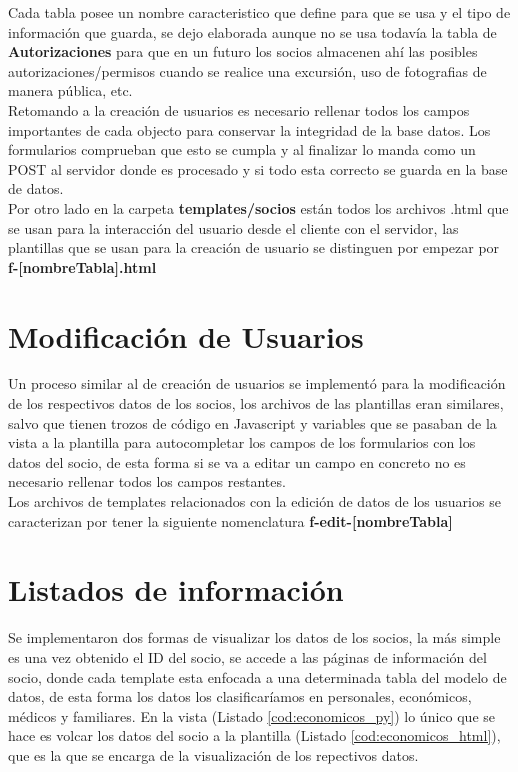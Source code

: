 Cada tabla posee un nombre caracteristico que define para que se usa y el tipo de información que guarda, se dejo elaborada aunque no se usa todavía la tabla de \textbf{Autorizaciones} para que en un futuro los socios almacenen ahí las posibles autorizaciones/permisos
cuando se realice una excursión, uso de fotografias de manera pública, etc.\\

Retomando a la creación de usuarios es necesario rellenar todos los campos importantes de cada objecto para conservar la integridad de la base datos. Los formularios comprueban que esto se cumpla y al finalizar lo manda como un POST
al servidor donde es procesado y si todo esta correcto se guarda en la base de datos.\\

Por otro lado en la carpeta \textbf{templates/socios} están todos los archivos .html que se usan para la interacción del usuario desde el cliente con el servidor, las plantillas que se usan para la creación de usuario se distinguen por 
empezar por \textbf{f-[nombreTabla].html}


\section{Modificación de Usuarios}
\label{4:sec6}
Un proceso similar al de creación de usuarios se implementó para la modificación de los respectivos datos de los socios, los archivos de las plantillas eran similares, salvo que tienen trozos de código en Javascript
y variables que se pasaban de la vista a la plantilla para autocompletar los campos de los formularios con los datos del socio, de esta forma si se va a editar un campo en concreto no es necesario rellenar 
todos los campos restantes.\\

Los archivos de templates relacionados con la edición de datos de los usuarios se caracterizan por tener la siguiente nomenclatura \textbf{f-edit-[nombreTabla]}
\section{Listados de información}
\label{4:sec7}
Se implementaron dos formas de visualizar los datos de los socios, la más simple es una vez obtenido el ID del socio, se accede a las páginas de información del socio, donde cada template esta enfocada a una determinada tabla
del modelo de datos, de esta forma los datos los clasificaríamos en personales, económicos, médicos y familiares. En la vista (Listado \ref{cod:economicos_py}) lo único que se hace es volcar los datos del socio a la plantilla 
(Listado \ref{cod:economicos_html}), que es la que se encarga de la visualización de los repectivos datos.

